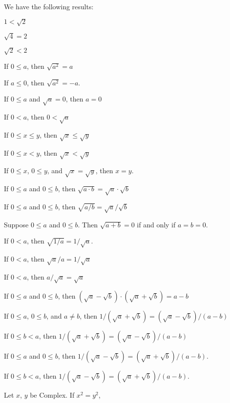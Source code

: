 \documentclass{article}
\begin{document}
We have the following results:
\begin{thm}
\item\label{square1:19} $1<\sqrt{2}$
\item\label{square1:20} $\sqrt{4}=2$
\item\label{square1:21} $\sqrt{2}<2$
\item\label{square1:22} If $0\leq a$, then $\sqrt{a^{2}}=a$
\item\label{square1:23} If $a\leq0$, then $\sqrt{a^{2}}=-a$.
\item\label{square1:24} If $0\leq a$ and $\sqrt{a}=0$, then $a=0$
\item\label{square1:25} If $0<a$, then $0<\sqrt{a}$
\item\label{square1:26} If $0\leq x\leq y$, then $\sqrt{x}\leq\sqrt{y}$
\item\label{square1:27} If $0\leq x<y$, then $\sqrt{x}<\sqrt{y}$
\item\label{square1:28} If $0\leq x$, $0\leq y$, and $\sqrt{x}=\sqrt{y}$,
  then $x=y$.
\item\label{square1:29} If $0\leq a$ and $0\leq b$,
  then $\sqrt{a\cdot b}=\sqrt{a}\cdot\sqrt{b}$
\item\label{square1:30} If $0\leq a$ and $0\leq b$,
  then $\sqrt{a/b} = \sqrt{a}/\sqrt{b}$
\item\label{square1:31} Suppose $0\leq a$ and $0\leq b$.
  Then $\sqrt{a+b}=0$ if and only if $a=b=0$.
\item\label{square1:32} If $0<a$, then $\sqrt{1/a}=1/\sqrt{a}$.
\item\label{square1:33} If $0<a$, then $\sqrt{a}/a=1/\sqrt{a}$
\item\label{square1:34} If $0<a$, then $a/\sqrt{a}=\sqrt{a}$
\item\label{square1:35} If $0\leq a$ and $0\leq b$,
  then $(\sqrt{a}-\sqrt{b})\cdot(\sqrt{a}+\sqrt{b})=a-b$
\item\label{square1:36} If $0\leq a$, $0\leq b$, and $a\neq b$,
  then $1/(\sqrt{a}+\sqrt{b})=(\sqrt{a}-\sqrt{b})/(a-b)$
\item\label{square1:37} If $0\leq b<a$, then
  $1/(\sqrt{a}+\sqrt{b})=(\sqrt{a}-\sqrt{b})/(a-b)$
\item\label{square1:38} If $0\leq a$ and $0\leq b$, then
  $1/(\sqrt{a}-\sqrt{b})=(\sqrt{a}+\sqrt{b})/(a-b)$.
\item\label{square1:39} If $0\leq b<a$, then
  $1/(\sqrt{a}-\sqrt{b})=(\sqrt{a}+\sqrt{b})/(a-b)$.
\item\label{square1:40} Let $x$, $y$ be Complex. If $x^{2}=y^{2}$,

\end{thm}
\end{document}
